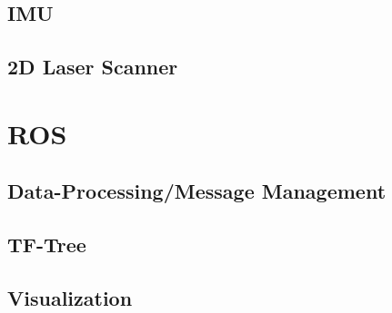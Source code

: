 	\subsection{IMU}

	\subsection{2D Laser Scanner}

\section{ROS}
\subsection{Data-Processing/Message Management}
\subsection{TF-Tree}
\subsection{Visualization}

